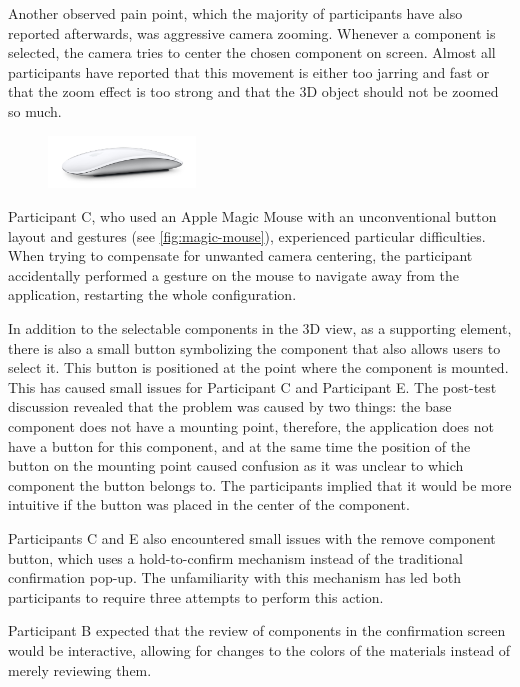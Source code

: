 Another observed pain point, which the majority of participants have also reported afterwards, was aggressive camera zooming. Whenever a component is selected, the camera tries to center the chosen component on screen. Almost all participants have reported that this movement is either too jarring and fast or that the zoom effect is too strong and that the 3D object should not be zoomed so much. 

\begin{figure}
    \centering
    \includegraphics[width=0.35\textwidth]{images/image_magicmouse.jpg}
    \label{fig:magic-mouse}
\end{figure}

Participant C, who used an Apple Magic Mouse with an unconventional button layout and gestures (see \autoref{fig:magic-mouse}), experienced particular difficulties. When trying to compensate for unwanted camera centering, the participant accidentally performed a gesture on the mouse to navigate away from the application, restarting the whole configuration.

In addition to the selectable components in the 3D view, as a supporting element, there is also a small button symbolizing the component that also allows users to select it. This button is positioned at the point where the component is mounted. This has caused small issues for Participant C and Participant E. The post-test discussion revealed that the problem was caused by two things: the base component does not have a mounting point, therefore, the application does not have a button for this component, and at the same time the position of the button on the mounting point caused confusion as it was unclear to which component the button belongs to. The participants implied that it would be more intuitive if the button was placed in the center of the component.

Participants C and E also encountered small issues with the remove component button, which uses a hold-to-confirm mechanism instead of the traditional confirmation pop-up. The unfamiliarity with this mechanism has led both participants to require three attempts to perform this action. 

Participant B expected that the review of components in the confirmation screen would be interactive, allowing for changes to the colors of the materials instead of merely reviewing them.

